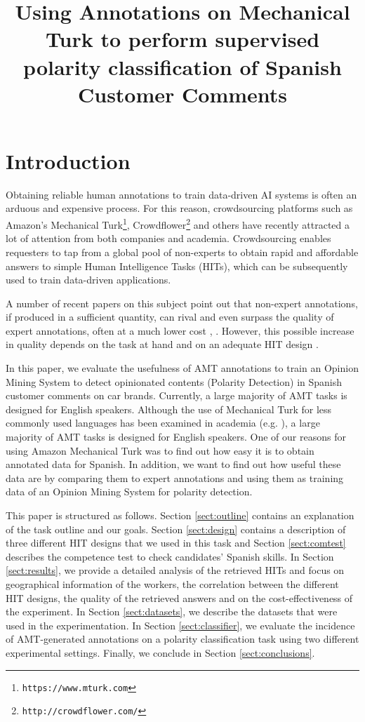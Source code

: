 \documentclass[11pt, a4paper,onecolumn]{article}
\title{Using Annotations on Mechanical Turk to perform supervised polarity classification of Spanish Customer Comments}
\begin{document}
\maketitleabstract

\section{Introduction}
\label{sec:intro}


Obtaining reliable human annotations to train data-driven AI systems is often an arduous and expensive process. For this reason, crowdsourcing platforms such as Amazon's Mechanical Turk\footnote{\texttt{https://www.mturk.com}}, Crowdflower\footnote{\texttt{http://crowdflower.com/}} and others have recently attracted a lot of attention from both companies and academia. Crowdsourcing enables requesters to tap from a global pool of non-experts to obtain rapid and affordable answers to simple Human Intelligence Tasks (HITs), which can be subsequently used to train data-driven applications.

A number of recent papers on this subject point out that non-expert annotations, if produced in a sufficient quantity, can rival and even surpass the quality of expert annotations, often at a much lower cost \cite{snow_cheap_2008}, \cite{su_internet-scale_2007}. However, this possible increase in quality depends on the task at hand and on an adequate HIT design \cite{kittur_crowdsourcing_2008}. 

In this paper, we evaluate the usefulness of AMT annotations to train an Opinion Mining System to detect opinionated contents (Polarity Detection) in Spanish customer comments on car brands. Currently, a large majority of AMT tasks is designed for English speakers. Although the use of Mechanical Turk for less commonly used languages has been examined in academia (e.g. \cite{irvine-klementiev:2010:MTURK}), a large majority of AMT tasks is designed for English speakers. One of our reasons for using Amazon Mechanical Turk was to find out how easy it is to obtain annotated data for Spanish. In addition, we want to find out how useful these data are by comparing them to expert annotations and using them as training data of an Opinion Mining System for polarity detection.

This paper is structured as follows. Section \ref{sect:outline} contains an explanation of the task outline and our goals. Section \ref{sect:design} contains a description of three different HIT designs that we used in this task and Section \ref{sect:comtest} describes the competence test to check candidates' Spanish skills. In Section \ref{sect:results}, we provide a detailed analysis of the retrieved HITs and focus on geographical information of the workers, the correlation between the different HIT designs, the quality of the retrieved answers and on the cost-effectiveness of  the experiment. In Section \ref{sect:datasets}, we describe the datasets that were used in the experimentation. In Section \ref{sect:classifier}, we evaluate the incidence of AMT-generated annotations on a polarity classification task using two different experimental settings. Finally, we conclude in Section \ref{sect:conclusions}.
\end{document}
